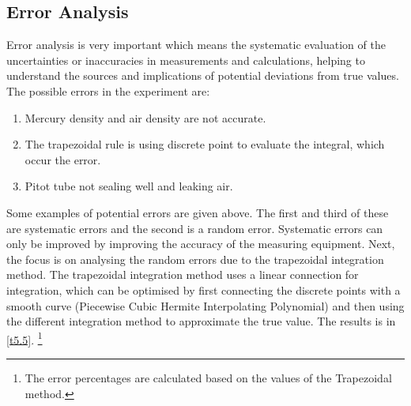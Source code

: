 \subsection*{Error Analysis}
Error analysis is very important which means the systematic evaluation of the uncertainties or inaccuracies in measurements and calculations, helping to understand the sources and implications of potential deviations from true values.
The possible errors in the experiment are:
\begin{enumerate}
    \item Mercury density and air density are not accurate.
    \item The trapezoidal rule is using discrete point to evaluate the integral, which occur the error.
    \item Pitot tube not sealing well and leaking air.
\end{enumerate}
Some examples of potential errors are given above. The first and third of these are systematic errors and the second is a random error.
Systematic errors can only be improved by improving the accuracy of the measuring equipment. Next, the focus is on analysing the random errors due to the trapezoidal integration method.
The trapezoidal integration method uses a linear connection for integration, which can be optimised by first connecting the discrete points with a smooth curve (Piecewise Cubic Hermite Interpolating Polynomial) and then using the different integration method to approximate the true value. The results is in \autoref{t5.5}.    \footnote{The error percentages are calculated based on the values of the Trapezoidal method.}

\begin{table}[htbp]
    \caption{Different integration method to calculate $C_L$}  
    \label{t5.5}
    \centering
    \end{table}

